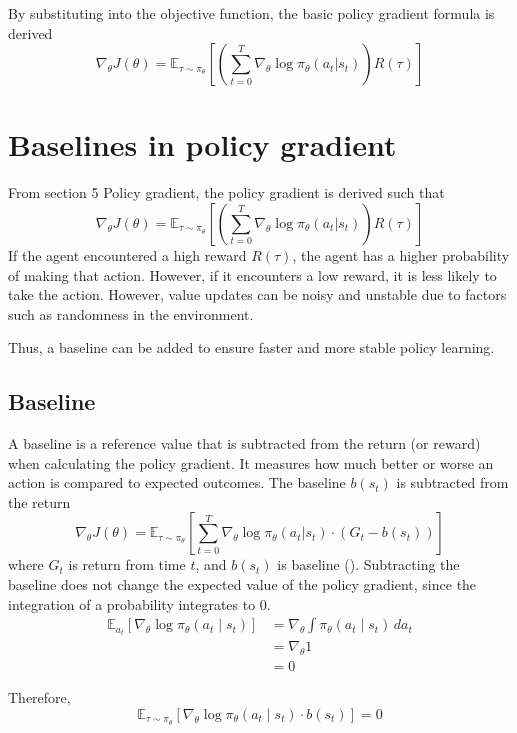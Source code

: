 \documentclass{article} %
\begin{document}
By substituting into the objective function, the basic policy gradient formula is derived
\[
\nabla_\theta J(\theta) = \mathbb{E}_{\tau \sim \pi_\theta} \left[ \left( \sum_{t=0}^T \nabla_\theta \log \pi_\theta (a_t | s_t) \right) R(\tau) \right]
\]

\section{Baselines in policy gradient}
From section 5 Policy gradient, the policy gradient is derived such that 
\[
\nabla_\theta J(\theta) = \mathbb{E}_{\tau \sim \pi_\theta} \left[ \left( \sum_{t=0}^T \nabla_\theta \log \pi_\theta (a_t | s_t) \right) R(\tau) \right]
\]
If the agent encountered a high reward \(R(\tau)\), the agent has a higher probability of making that action. However, if it encounters a low reward, it is less likely to take the action. However, value updates can be noisy and unstable due to factors such as randomness in the environment. 

Thus, a baseline can be added to ensure faster and more stable policy learning. 

\subsection{Baseline}
A baseline is a reference value that is subtracted from the return (or reward) when calculating the policy gradient. It measures how much better or worse an action is compared to expected outcomes.
The baseline \(b(s_t)\) is subtracted from the return
\[
\nabla_\theta J(\theta) = \mathbb{E}_{\tau \sim \pi_\theta} \left[ \sum_{t=0}^T \nabla_\theta \log \pi_\theta (a_t | s_t) \cdot (G_t - b(s_t)) \right]
\]
where \( G_t \) is return from time \( t \), and \( b(s_t) \) is baseline (\cite{williams1992simple}).
Subtracting the baseline does not change the expected value of the policy gradient, since the integration of a probability integrates to 0.
\begin{align*}
    \mathbb{E}_{a_{t}} \left[ \nabla_{\theta} \log \pi_{\theta}(a_{t} \mid s_{t}) \right] 
    &= \nabla_{\theta} \int \pi_{\theta}(a_{t} \mid s_{t}) \, da_{t} \\
    &= \nabla_{\theta} 1 \\
    &= 0
\end{align*}

Therefore, 
\[
\mathbb{E}_{\tau \sim \pi_\theta}\left[\nabla_{\theta}\log\pi_{\theta}(a_{t} \mid s_{t})\cdot b(s_{t})\right]=0
\]
\end{document}
